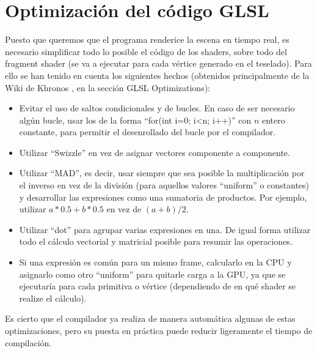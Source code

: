 \section*{Optimización del código GLSL}
	Puesto que queremos que el programa renderice la escena en tiempo real, es necesario simplificar todo lo posible el código de los shaders, sobre todo del fragment shader (se va a ejecutar para cada vértice generado en el teselado). Para ello se han tenido en cuenta los siguientes hechos (obtenidos principalmente de la Wiki de Khronos \cite{KhronosWiki}, en la sección GLSL Optimizations):
	\begin{itemize}
		\item Evitar el uso de saltos condicionales y de bucles. En caso de ser necesario algún bucle, usar los de la forma ``for(int i=$0$; i<n; i++)'' con $n$ entero constante, para permitir el desenrollado del bucle por el compilador.
		\item Utilizar ``Swizzle'' en vez de asignar vectores componente a componente.
		\item Utilizar ``MAD'', es decir, usar siempre que sea posible la multiplicación por el inverso en vez de la división (para aquellos valores ``uniform'' o constantes) y desarrollar las expresiones como una sumatoria de productos. Por ejemplo, utilizar $a*0.5 + b*0.5$ en vez de $(a+b)/2$.
		\item Utilizar ``dot'' para agrupar varias expresiones en una. De igual forma utilizar todo el cálculo vectorial y matricial posible para resumir las operaciones.
		\item Si una expresión es común para un mismo frame, calcularlo en la CPU y asignarlo como otro ``uniform'' para quitarle carga a la GPU, ya que se ejecutaría para cada primitiva o vértice (dependiendo de en qué shader se realize el cálculo).
	\end{itemize}
	
	Es cierto que el compilador ya realiza de manera automática algunas de estas optimizaciones, pero su puesta en práctica puede reducir ligeramente el tiempo de compilación.

